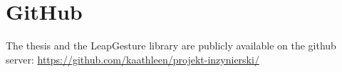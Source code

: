 
\chapter{GitHub}
The thesis and the LeapGesture library are publicly available on the github server:
\url{https://github.com/kaathleen/projekt-inzynierski/} 